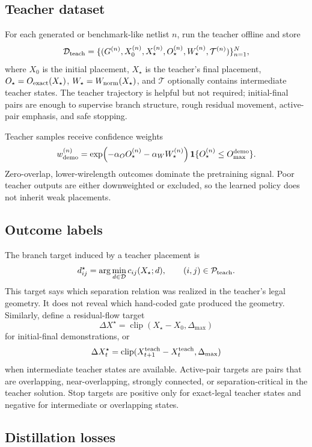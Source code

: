 \documentclass[11pt]{article}
\newcommand{\one}{\mathbf{1}}
\newcommand{\Branch}{\mathcal{D}}
\newcommand{\Pset}{\mathcal{P}}
\newcommand{\ExactOv}{O_{\rm exact}}
\newcommand{\WireNorm}{W_{\rm norm}}
\begin{document}
\subsection{Teacher dataset}

For each generated or benchmark-like netlist $n$, run the teacher offline and store
\[
    \mathcal D_{\rm teach}=\{(G^{(n)},X_0^{(n)},X_\star^{(n)},O_\star^{(n)},W_\star^{(n)},\mathcal T^{(n)})\}_{n=1}^N,
\]
where $X_0$ is the initial placement, $X_\star$ is the teacher's final placement, $O_\star=\ExactOv(X_\star)$, $W_\star=\WireNorm(X_\star)$, and $\mathcal T$ optionally contains intermediate teacher states. The teacher trajectory is helpful but not required; initial-final pairs are enough to supervise branch structure, rough residual movement, active-pair emphasis, and safe stopping.

Teacher samples receive confidence weights
\[
    w_{\rm demo}^{(n)}=
    \exp\!\left(-\alpha_O O_\star^{(n)}-\alpha_W W_\star^{(n)}\right)
    \one\{O_\star^{(n)}\le O_{\rm max}^{\rm demo}\}.
\]
Zero-overlap, lower-wirelength outcomes dominate the pretraining signal. Poor teacher outputs are either downweighted or excluded, so the learned policy does not inherit weak placements.

\subsection{Outcome labels}

The branch target induced by a teacher placement is
\[
    d_{ij}^{\star}=\arg\min_{d\in\Branch} c_{ij}(X_\star;d),
    \qquad (i,j)\in\Pset_{\rm teach}.
\]
This target says which separation relation was realized in the teacher's legal geometry. It does not reveal which hand-coded gate produced the geometry. Similarly, define a residual-flow target
\[
    \Delta X^{\star}=\operatorname{clip}(X_\star-X_0,\Delta_{\max})
\]
for initial-final demonstrations, or
\[
    \Delta X_t^{\star}=\operatorname{clip}(X_{t+1}^{\rm teach}-X_t^{\rm teach},\Delta_{\max})
\]
when intermediate teacher states are available. Active-pair targets are pairs that are overlapping, near-overlapping, strongly connected, or separation-critical in the teacher solution. Stop targets are positive only for exact-legal teacher states and negative for intermediate or overlapping states.

\subsection{Distillation losses}
\end{document}
